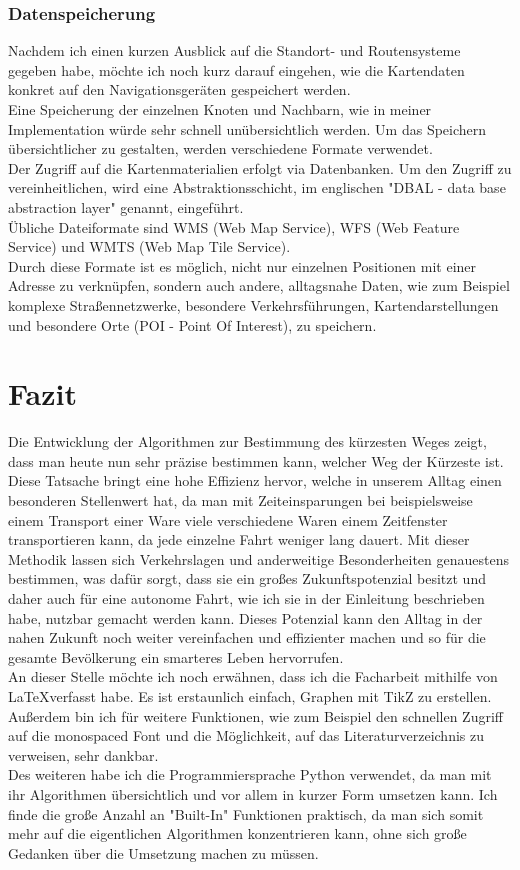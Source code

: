 \documentclass[12pt]{article}
\begin{document}
		\subsubsection{Datenspeicherung}
			Nachdem ich einen kurzen Ausblick auf die Standort- und Routensysteme gegeben habe, möchte ich noch kurz darauf eingehen, wie die Kartendaten konkret auf den Navigationsgeräten gespeichert werden.\\
			Eine Speicherung der einzelnen Knoten und Nachbarn, wie in meiner Implementation würde sehr schnell unübersichtlich werden. Um das Speichern übersichtlicher zu gestalten, werden verschiedene Formate verwendet.\\
			Der Zugriff auf die Kartenmaterialien erfolgt via Datenbanken. Um den Zugriff zu vereinheitlichen, wird eine Abstraktionsschicht, im englischen "DBAL - data base abstraction layer" genannt, eingeführt. \cite{datenbank}\\
			Übliche Dateiformate sind WMS (Web Map Service), WFS (Web Feature Service) und WMTS (Web Map Tile Service). \cite{geodienste}\\
			Durch diese Formate ist es möglich, nicht nur einzelnen Positionen mit einer Adresse zu verknüpfen, sondern auch andere, alltagsnahe Daten, wie zum Beispiel komplexe Straßennetzwerke, besondere Verkehrsführungen, Kartendarstellungen und besondere Orte (POI - Point Of Interest), zu speichern. \cite{datenbank}


\section{Fazit}
	Die Entwicklung der Algorithmen zur Bestimmung des kürzesten Weges zeigt, dass man heute nun sehr präzise bestimmen kann, welcher Weg der Kürzeste ist. Diese Tatsache bringt eine hohe Effizienz hervor, welche in unserem Alltag einen besonderen Stellenwert hat, da man mit Zeiteinsparungen bei beispielsweise einem Transport einer Ware viele verschiedene Waren einem Zeitfenster transportieren kann, da jede einzelne Fahrt weniger lang dauert. Mit dieser Methodik lassen sich Verkehrslagen und anderweitige Besonderheiten genauestens bestimmen, was dafür sorgt, dass sie ein großes Zukunftspotenzial besitzt und daher auch für eine autonome Fahrt, wie ich sie in der Einleitung beschrieben habe, nutzbar gemacht werden kann. Dieses Potenzial kann den Alltag in der nahen Zukunft noch weiter vereinfachen und effizienter machen und so für die gesamte Bevölkerung ein smarteres Leben hervorrufen.\\
	An dieser Stelle möchte ich noch erwähnen, dass ich die Facharbeit mithilfe von \LaTeX verfasst habe. Es ist erstaunlich einfach, Graphen mit TikZ zu erstellen. Außerdem bin ich für weitere Funktionen, wie zum Beispiel den schnellen Zugriff auf die monospaced Font und die Möglichkeit, auf das Literaturverzeichnis zu verweisen, sehr dankbar.\\
	Des weiteren habe ich die Programmiersprache Python verwendet, da man mit ihr Algorithmen übersichtlich und vor allem in kurzer Form umsetzen kann. Ich finde die große Anzahl an "Built-In" Funktionen praktisch, da man sich somit mehr auf die eigentlichen Algorithmen konzentrieren kann, ohne sich große Gedanken über die Umsetzung machen zu müssen.
\end{document}
